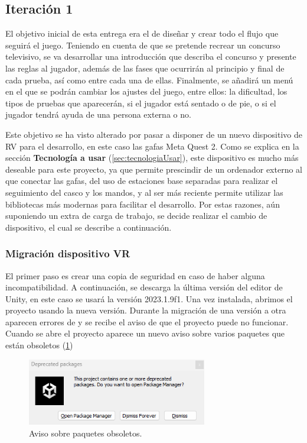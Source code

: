 
\subsection{Iteración 1}

El objetivo inicial de esta entrega era el de diseñar y crear todo el flujo que seguirá el juego. Teniendo en cuenta de que se pretende recrear un concurso televisivo, se va desarrollar una introducción que describa el concurso y presente las reglas al jugador, además de las fases que ocurrirán al principio y final de cada prueba, así como entre cada una de ellas. Finalmente, se añadirá un menú en el que se podrán cambiar los ajustes del juego, entre ellos: la dificultad, los tipos de pruebas que aparecerán, si el jugador está sentado o de pie, o si el jugador tendrá ayuda de una persona externa o no.

Este objetivo se ha visto alterado por pasar a disponer de un nuevo dispositivo de RV para el desarrollo, en este caso las gafas Meta Quest 2. Como se explica en la sección \textbf{Tecnología a usar} (\ref{sec:tecnologiaUsar}), este dispositivo es mucho más deseable para este proyecto, ya que permite prescindir de un ordenador externo al que conectar las gafas, del uso de estaciones base separadas para realizar el seguimiento del casco y los mandos, y al ser más reciente permite utilizar las bibliotecas más modernas para facilitar el desarrollo. Por estas razones, aún suponiendo un extra de carga de trabajo, se decide realizar el cambio de dispositivo, el cual se describe a continuación.


\subsubsection{Migración dispositivo VR}

El primer paso es crear una copia de seguridad en caso de haber alguna incompatibilidad. A continuación, se descarga la última versión del editor de Unity, en este caso se usará la versión 2023.1.9f1. Una vez instalada, abrimos el proyecto usando la nueva versión. Durante la migración de una versión a otra aparecen errores de y se recibe el aviso de que el proyecto puede no funcionar. Cuando se abre el proyecto aparece un nuevo aviso sobre varios paquetes que están obsoletos (\ref{fig:deprecated})




\begin{figure}
	\centering
	\includegraphics[width=0.7\textwidth]{04.Desarrollo/05.Entrega5/01.Iteracion5_1/00.Figuras/03.deprecated.png}
	\caption{Aviso sobre paquetes obsoletos.}
	\label{fig:deprecated}
\end{figure}


